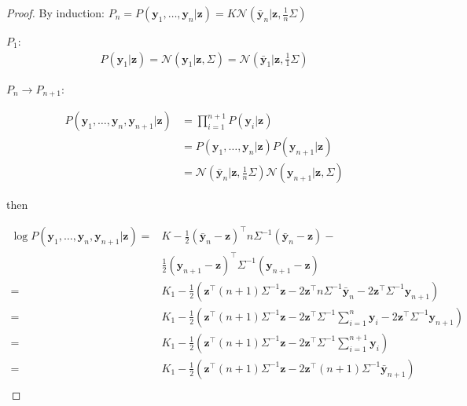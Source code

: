 \documentclass[12pt]{article}
\begin{document}
    \begin{proof}
        By induction:
        $P_n=P(\mathbf{y}_1,\ldots,\mathbf{y}_n|\mathbf{z})=K\mathcal{N}(\bar{\mathbf{y}}_n|\mathbf{z},\frac{1}{n}\Sigma)$

        $P_1$:
        \begin{align*}
            P(\mathbf{y}_1|\mathbf{z})=\mathcal{N}(\mathbf{y}_1|\mathbf{z},\Sigma)=\mathcal{N}(\bar{\mathbf{y}}_1|\mathbf{z},\frac{1}{1}\Sigma)
        \end{align*}

        $P_n\rightarrow P_{n+1}$:

        \begin{align*}
            P(\mathbf{y}_1,\ldots,\mathbf{y}_n,\mathbf{y}_{n+1}|\mathbf{z})&=\prod_{i=1}^{n+1} P(\mathbf{y}_i|\mathbf{z})\\
                      &=P(\mathbf{y}_1,\ldots,\mathbf{y}_n|\mathbf{z})P(\mathbf{y}_{n+1}|\mathbf{z})\\
                      &=\mathcal{N}(\bar{\mathbf{y}}_n|\mathbf{z},\frac{1}{n}\Sigma)\mathcal{N}(\mathbf{y}_{n+1}|\mathbf{z},\Sigma)
        \end{align*}

        \noindent then

        \begin{align*}
            \log
            P(\mathbf{y}_1,\ldots,\mathbf{y}_n,\mathbf{y}_{n+1}|\mathbf{z})=&K-\frac{1}{2}(\bar{\mathbf{y}}_n-\mathbf{z})^\intercal
            n\Sigma^{-1}(\bar{\mathbf{y}}_n-\mathbf{z})-\\
            &\frac{1}{2}(\mathbf{y}_{n+1}-\mathbf{z})^\intercal\Sigma^{-1}(\mathbf{y}_{n+1}-\mathbf{z})\\
            =&K_1-\frac{1}{2}\left(\mathbf{z}^\intercal(n+1)\Sigma^{-1}\mathbf{z}-2\mathbf{z}^\intercal n\Sigma^{-1}\bar{\mathbf{y}}_n-2\mathbf{z}^\intercal\Sigma^{-1}\mathbf{y}_{n+1}\right)\\
            =&K_1-\frac{1}{2}\left(\mathbf{z}^\intercal(n+1)\Sigma^{-1}\mathbf{
                z}-2\mathbf{z}^\intercal \Sigma^{-1}\sum_{i=1}^n\mathbf{y}_i-2\mathbf{z}^\intercal\Sigma^{-1}\mathbf{y}_{n+1}\right)\\
            =&K_1-\frac{1}{2}\left(\mathbf{z}^\intercal(n+1)\Sigma^{-1}\mathbf{
                z}-2\mathbf{z}^\intercal\Sigma^{-1}\sum_{i=1}^{n+1}\mathbf{y}_i\right)\\
            =&K_1-\frac{1}{2}\left(\mathbf{z}^\intercal(n+1)\Sigma^{-1}\mathbf{
                z}-2\mathbf{z}^\intercal(n+1)\Sigma^{-1}\bar{\mathbf{y}}_{n+1}\right)\\
        \end{align*}


\end{proof}
\end{document}
